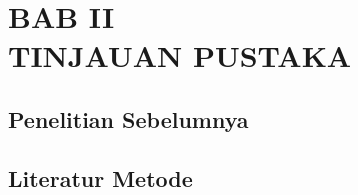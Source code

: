 \chapter*{
    BAB II\\
    \vspace{-10pt}
    TINJAUAN PUSTAKA
}

\section{Penelitian Sebelumnya}
\blindtext
\section{Literatur Metode}
